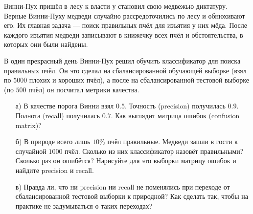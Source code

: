 \documentclass[12pt, a4paper, oneside]{article}
\theoremstyle{plain} %
\theoremstyle{definition}
\newcounter{problem}%
\renewcommand{\theproblem}{\arabic{problem}}
\newenvironment{problem}{
\addtocounter{problem}{1}\noindent{ \color{titleblue} \large \bfseries Упражнение~\theproblem \vspace{1ex} \newline}
}{ }
\begin{document}

\begin{problem} 
Винни-Пух пришёл в лесу к власти у становил свою медвежью диктатуру. Верные Винни-Пуху медведи случайно рассредоточились по лесу и обнюхивают его. Их главная задача --- поиск правильных пчёл для изъятия у них мёда. После каждого изъятия медведи записывают в книжечку всех пчёл и обстоятельства, в которых они были найдены. 

В один прекрасный день Винни-Пух решил обучить классификатор для поиска правильных пчёл. Он это сделал на сбалансированной обучающей выборке (взял по $5000$ плохих и хороших пчёл), а после на сбалансированной тестовой выборке (по $500$ пчёл) он посчитал метрики качества. 

\begin{enumerate} 
\item[а)] В качестве порога Винни взял $0.5$. Точность (precision) получилась $0.9$. Полнота (recall) получилась $0.7$. Как выглядит матрица ошибок (confusion matrix)? 

\item[б)] В природе всего лишь $10\%$ пчёл правильные. Медведи зашли в гости к случайной $1000$ пчёл. Сколько из них классификатор назовёт правильными? Сколько раз он ошибётся? Нарисуйте для это выборки матрицу ошибок и найдите precision и recall. 

\item[в)] Правда ли, что ни precision ни recall не поменялись при переходе от сбалансированной тестовой выборки к природной? Как сделать так, чтобы на практике не задумываться о таких переходах? 

\end{enumerate} 
\end{problem} 
\end{document}
